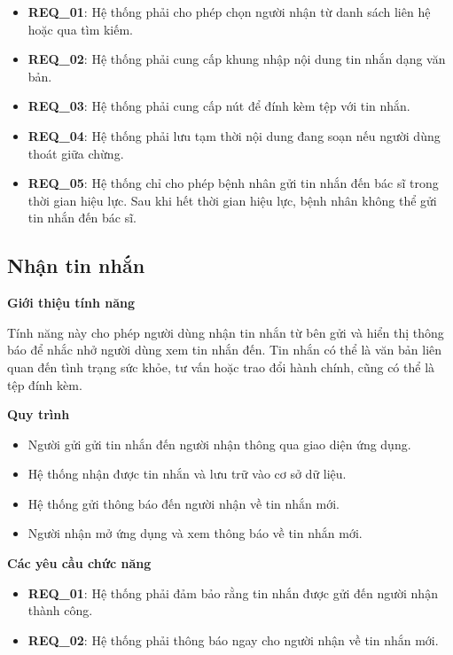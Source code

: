 \begin{itemize}

\item \textbf{REQ\_01}: Hệ thống phải cho phép chọn người nhận từ danh sách liên hệ hoặc qua tìm kiếm.

\item \textbf{REQ\_02}: Hệ thống phải cung cấp khung nhập nội dung tin nhắn dạng văn bản.

\item \textbf{REQ\_03}: Hệ thống phải cung cấp nút để đính kèm tệp với tin nhắn.

\item \textbf{REQ\_04}: Hệ thống phải lưu tạm thời nội dung đang soạn nếu người dùng thoát giữa chừng.

\item \textbf{REQ\_05}: Hệ thống chỉ cho phép bệnh nhân gửi tin nhắn đến bác sĩ trong thời gian hiệu lực. Sau khi hết thời gian hiệu lực, bệnh nhân không thể gửi tin nhắn đến bác sĩ. 

\end{itemize}

\subsection{Nhận tin nhắn}

\noindent \textbf{Giới thiệu tính năng}

Tính năng này cho phép người dùng nhận tin nhắn từ bên gửi và hiển thị thông báo để nhắc nhở người dùng xem tin nhắn đến. Tin nhắn có thể là văn bản liên quan đến tình trạng sức khỏe, tư vấn hoặc trao đổi hành chính, cũng có thể là tệp đính kèm.

\noindent \textbf{Quy trình}

\begin{itemize}
    \item Người gửi gửi tin nhắn đến người nhận thông qua giao diện ứng dụng.
    \item Hệ thống nhận được tin nhắn và lưu trữ vào cơ sở dữ liệu.
    \item Hệ thống gửi thông báo đến người nhận về tin nhắn mới.
    \item Người nhận mở ứng dụng và xem thông báo về tin nhắn mới.
\end{itemize}


\noindent \textbf{Các yêu cầu chức năng}

\begin{itemize}

\item \textbf{REQ\_01}: Hệ thống phải đảm bảo rằng tin nhắn được gửi đến người nhận thành công.
\item \textbf{REQ\_02}: Hệ thống phải thông báo ngay cho người nhận về tin nhắn mới.

\end{itemize}

